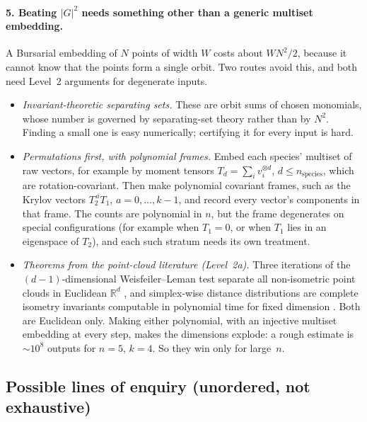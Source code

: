 \documentclass[11pt]{article}
\theoremstyle{definition}
\theoremstyle{remark}
\begin{document}
\paragraph{5. Beating $|G|^2$ needs something other than a generic multiset embedding.}
A Bursarial embedding of $N$ points of width $W$ costs about $W N^2/2$,
because it cannot know that the points form a single orbit. Two routes avoid
this, and both need Level~2 arguments for degenerate inputs.
\begin{itemize}
  \item \emph{Invariant-theoretic separating sets.} These are orbit sums of
    chosen monomials, whose number is governed by separating-set theory rather
    than by $N^2$. Finding a small one is easy numerically; certifying it for
    every input is hard.
  \item \emph{Permutations first, with polynomial frames.} Embed each species'
    multiset of raw vectors, for example by moment tensors
    $T_d = \sum_i v_i^{\otimes d}$, $d \le n_{\text{species}}$, which are
    rotation-covariant. Then make polynomial covariant frames, such as the
    Krylov vectors $T_2^{\,a} T_1$, $a = 0, \ldots, k-1$, and record every
    vector's components in that frame. The counts are polynomial in $n$, but
    the frame degenerates on special configurations (for example when
    $T_1 = 0$, or when $T_1$ lies in an eigenspace of $T_2$), and each such
    stratum needs its own treatment.
  \item \emph{Theorems from the point-cloud literature (Level~2a).} Three
    iterations of the $(d-1)$-dimensional Weisfeiler--Leman test separate all
    non-isometric point clouds in Euclidean $\mathbb{R}^d$ \cite{DKRPB23}, and
    simplex-wise distance distributions are complete isometry invariants
    computable in polynomial time for fixed dimension \cite{WK23, K23}. Both
    are Euclidean only. Making either polynomial, with an injective multiset
    embedding at every step, makes the dimensions explode: a rough estimate is
    $\sim 10^8$ outputs for $n = 5$, $k = 4$. So they win only for large~$n$.
\end{itemize}

\subsection{Possible lines of enquiry (unordered, not exhaustive)}
\end{document}
